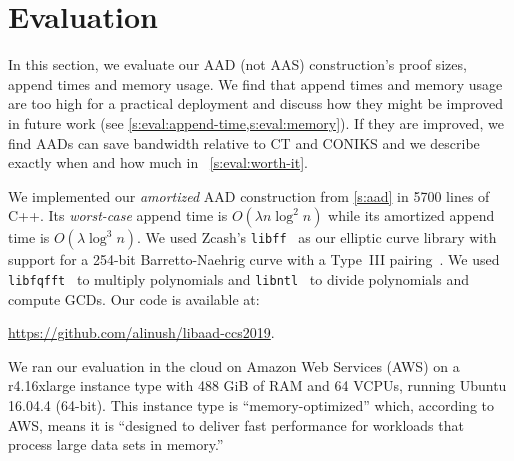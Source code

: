 \section{Evaluation}
\label{s:eval}

In this section, we evaluate our AAD (not AAS) construction's proof sizes, append times and memory usage.
We find that append times and memory usage are too high for a practical deployment and discuss how they might be improved in future work (see \cref{s:eval:append-time,s:eval:memory}).
If they are improved, we find AADs can save bandwidth relative to CT and CONIKS and we describe exactly when and how much in ~\cref{s:eval:worth-it}.

We implemented our \textit{amortized} AAD construction from \cref{s:aad} in 5700 lines of C++.
Its \textit{worst-case} append time is $O(\lambda n \log^2{n})$ while its amortized append time is $O(\lambda \log^3{n})$.
We used Zcash's \texttt{libff}~\cite{libff} as our elliptic curve library with support for a 254-bit Barretto-Naehrig curve with a Type~III pairing~\cite{bn-curve}.
We used \texttt{libfqfft}~\cite{libfqfft} to multiply polynomials and \texttt{libntl}~\cite{libntl} to divide polynomials and compute GCDs.
Our code is available at:
\begin{center}
    \url{https://github.com/alinush/libaad-ccs2019}.
\end{center}
We ran our evaluation in the cloud on Amazon Web Services (AWS) on a r4.16xlarge instance type with 488 GiB of RAM and 64 VCPUs, running Ubuntu 16.04.4 (64-bit).
This instance type is ``memory-optimized'' which, according to AWS, means it is ``designed to deliver fast performance for workloads that process large data sets in memory.''

